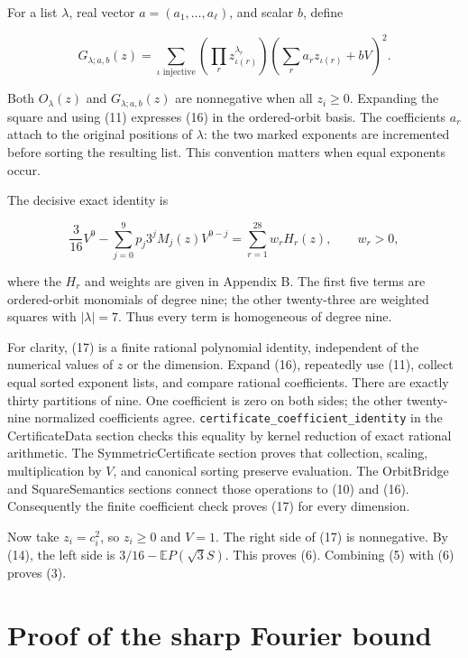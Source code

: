 \documentclass[11pt]{article}
\begin{document}
For a list \(\lambda\), real vector \(a=(a_1,\ldots,a_\ell)\), and
scalar \(b\), define

\[G_{\lambda;a,b}(z)=\sum_{\iota\text{ injective}}
 \left(\prod_rz_{\iota(r)}^{\lambda_r}\right)
 \left(\sum_ra_rz_{\iota(r)}+bV\right)^2. \tag{16}\]

Both \(O_\lambda(z)\) and \(G_{\lambda;a,b}(z)\) are nonnegative when
all \(z_i\ge0\). Expanding the square and using (11) expresses (16) in
the ordered-orbit basis. The coefficients \(a_r\) attach to the original
positions of \(\lambda\): the two marked exponents are incremented
before sorting the resulting list. This convention matters when equal
exponents occur.

The decisive exact identity is

\[\frac3{16}V^9-\sum_{j=0}^9p_j3^jM_j(z)V^{9-j}
   =\sum_{r=1}^{28}w_rH_r(z), \qquad w_r>0, \tag{17}\]

where the \(H_r\) and weights are given in Appendix B. The first five
terms are ordered-orbit monomials of degree nine; the other twenty-three
are weighted squares with \(|\lambda|=7\). Thus every term is
homogeneous of degree nine.

For clarity, (17) is a finite rational polynomial identity, independent
of the numerical values of \(z\) or the dimension. Expand (16),
repeatedly use (11), collect equal sorted exponent lists, and compare
rational coefficients. There are exactly thirty partitions of nine. One
coefficient is zero on both sides; the other twenty-nine normalized
coefficients agree. \texttt{certificate\_coefficient\_identity} in the
CertificateData section checks this equality by kernel reduction of
exact rational arithmetic. The SymmetricCertificate section proves that
collection, scaling, multiplication by \(V\), and canonical sorting
preserve evaluation. The OrbitBridge and SquareSemantics sections
connect those operations to (10) and (16). Consequently the finite
coefficient check proves (17) for every dimension.

Now take \(z_i=c_i^2\), so \(z_i\ge0\) and \(V=1\). The right side of
(17) is nonnegative. By (14), the left side is
\(3/16-\mathbb EP(\sqrt3S)\). This proves (6). Combining (5) with (6)
proves (3).

\hypertarget{proof-of-the-sharp-fourier-bound}{%
\section{Proof of the sharp Fourier
bound}\label{proof-of-the-sharp-fourier-bound}}
\end{document}
